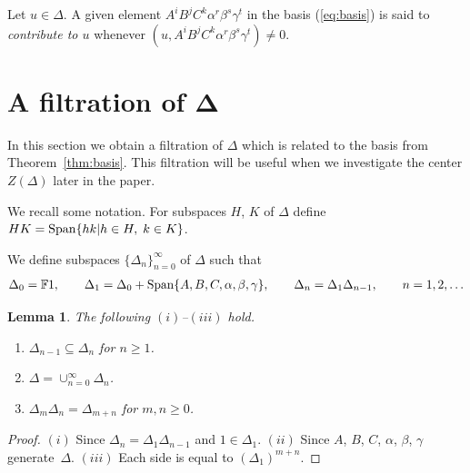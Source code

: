 \documentclass[11pt]{article}
\numberwithin{equation}{section}
\newtheorem{Lemma}[Theorem]{Lemma}
\begin{document}
\begin{Definition}
\label{def:contrib}
\rm
Let $u \in \Delta $. A given element
 $A^iB^jC^k\alpha^r\beta^s\gamma^t$ in the basis
(\ref{eq:basis}) is said to
{\it contribute to
  $u$} whenever $(u,
 A^iB^jC^k\alpha^r\beta^s\gamma^t )
  \not=0$.
\end{Definition}







\section[A filtration of $\Delta$]{A f\/iltration of $\boldsymbol{\Delta}$}


In this section we obtain
a f\/iltration of $\Delta $
which
is related to the basis from Theorem~\ref{thm:basis}.
 This f\/iltration will be useful
when we investigate the center  $Z(\Delta)$ later in the paper.


We recall some notation.
For subspaces $H$, $K$ of $\Delta $ def\/ine
$HK={\rm Span}\lbrace hk | h \in H, \; k \in K\rbrace$.

\begin{Definition}
\label{def:ui}
We def\/ine subspaces
$\lbrace \Delta_n\rbrace_{n=0}^\infty$
of $\Delta $ such that
\begin{gather*}
\Delta_0=\mathbb F 1,
  \qquad
\Delta_1 =\Delta_0+{\rm Span}\lbrace A,B,C,\alpha,\beta,\gamma\rbrace,
 \qquad
\Delta_n=\Delta_1 \Delta_{n-1}, \qquad n=1,2,\ldots
\end{gather*}
\end{Definition}

\begin{Lemma}
\label{lem:filt}
The following $(i)$--$(iii)$ hold.
\begin{enumerate}\itemsep=0pt
\item[$(i)$]
 $\Delta_{n-1}\subseteq \Delta_n$ for  $n\geq 1$.
\item[$(ii)$]
$\Delta=\cup_{n=0}^\infty \Delta_n$.
\item[$(iii)$]
$\Delta_m \Delta_n = \Delta_{m+n} $ for
 $m,n\geq 0$.
\end{enumerate}
\end{Lemma}

\begin{proof}
$(i)$ Since $\Delta_n=\Delta_1 \Delta_{n-1}$
and $1 \in \Delta_1$.
$(ii)$ Since $A$, $B$, $C$, $\alpha$, $\beta$, $\gamma $ generate~$\Delta$.
$(iii)$ Each side is equal to
$(\Delta_1)^{m+n}$.
\end{proof}
\end{document}
